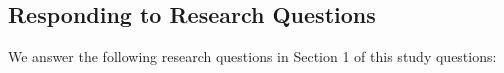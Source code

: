 \documentclass[12pt, a4paper]{article}
\begin{document}
%
%
%
%
%
%


\subsection{Responding to Research Questions}
We answer the following research questions in Section 1 of this study questions:
\end{document}

